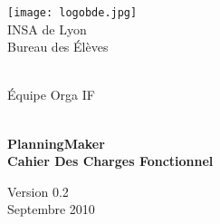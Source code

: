 \begin{titlepage}



\begin{minipage}{0.3\textwidth}
\centering
\texttt{[image: logobde.jpg]}
\\
INSA de Lyon \\
Bureau des Élèves \\

\end{minipage}
\hfill
\begin{minipage}{0.3\textwidth}
\centering
 
~
\\[3cm]

Équipe Orga IF
\end{minipage}


\begin{center} 
\hrulefill \\[0.4cm]
{ \Huge \bfseries PlanningMaker}\\ {  \bfseries Cahier Des Charges Fonctionnel} \\[0.4cm]
 \hrulefill






\vfill {\Large Version 0.2} \\[2cm]
{ Septembre 2010  } \\





\end{center}


\end{titlepage}


